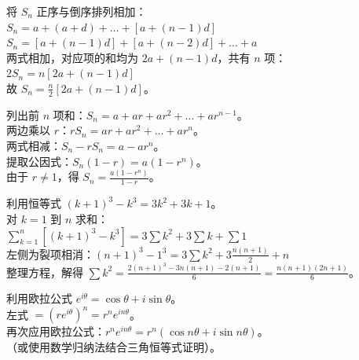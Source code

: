 \begin{questions}
\begin{solution}
    将 $S_{n}$ 正序与倒序排列相加：\\
    $S_{n} = a + (a+d) + \dots + [a+(n-1)d]$ \\
    $S_{n} = [a+(n-1)d] + [a+(n-2)d] + \dots + a$ \\
    两式相加，对应项的和均为 $2a + (n-1)d$，共有 $n$ 项：\\
    $2S_{n} = n[2a + (n-1)d]$ \\
    故 $S_{n} = \frac{n}{2}[2a + (n-1)d]$。
\end{solution}

\begin{solution}
    列出前 $n$ 项和：$S_{n} = a + ar + ar^{2} + \dots + ar^{n-1}$。\\
    两边乘以 $r$：$r S_{n} = ar + ar^{2} + \dots + ar^{n}$。\\
    两式相减：$S_{n} - r S_{n} = a - ar^{n}$。\\
    提取公因式：$S_{n}(1-r) = a(1-r^{n})$。\\
    由于 $r \neq 1$，得 $S_{n} = \frac{a(1-r^{n})}{1-r}$。
\end{solution}

\begin{solution}
    利用恒等式 $(k+1)^{3} - k^{3} = 3k^{2} + 3k + 1$。\\
    对 $k=1$ 到 $n$ 求和：\\
    $\sum_{k=1}^{n} [(k+1)^{3} - k^{3}] = 3\sum k^{2} + 3\sum k + \sum 1$ \\
    左侧为裂项相消：$(n+1)^{3} - 1^{3} = 3\sum k^{2} + 3\frac{n(n+1)}{2} + n$ \\
    整理方程，解得 $\sum k^{2} = \frac{2(n+1)^{3} - 3n(n+1) - 2(n+1)}{6} = \frac{n(n+1)(2n+1)}{6}$。
\end{solution}

\begin{solution}
    利用欧拉公式 $e^{i\theta} = \cos\theta + i \sin\theta$。\\
    左式 $= (r e^{i\theta})^{n} = r^{n} e^{in\theta}$。\\
    再次应用欧拉公式：$r^{n} e^{in\theta} = r^{n}(\cos n\theta + i \sin n\theta)$。\\
    （或使用数学归纳法结合三角恒等式证明）。
\end{solution}


\end{questions}
